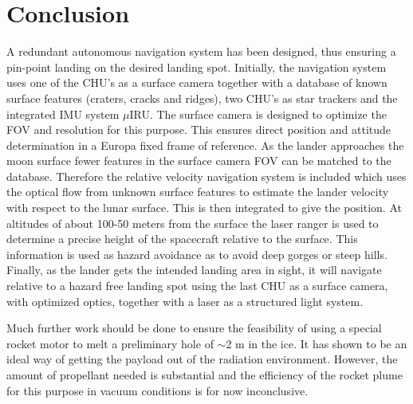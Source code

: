 \chapter{Conclusion}


A redundant autonomous navigation system has been designed, thus ensuring a pin-point landing on the desired landing spot. Initially, the navigation system uses one of the CHU's as a surface camera together with a database of known surface features (craters, cracks and ridges), two CHU's as star trackers and the integrated IMU system $\mu$IRU. The surface camera is designed to optimize the FOV and resolution for this purpose. This ensures direct position and attitude determination in a Europa fixed frame of reference.
As the lander approaches the moon surface fewer features in the surface camera FOV
can be matched to the database. Therefore the relative velocity navigation system is included
which uses the optical flow from unknown surface features to estimate
the lander velocity with respect to the lunar surface. This is then integrated to give the
position. At altitudes of about 100-50 meters from the surface the laser ranger is used to determine a precise height of the spacecraft relative to the surface. This information is used as hazard avoidance as to avoid deep gorges or steep hills. Finally, as the lander gets the intended landing area in sight, it will navigate
relative to a hazard free landing spot using the last CHU as a surface camera, with optimized optics, together with a laser as a structured light system. 

Much further work should be done to ensure the feasibility of using a special rocket motor to melt a preliminary hole of $\sim$2 m in the ice. It has shown to be an ideal way of getting the payload out of the radiation environment. However, the amount of propellant needed is substantial and the efficiency of the rocket plume for this purpose in vacuum conditions is for now inconclusive. 

